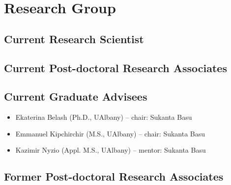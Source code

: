 \section{Research Group}

\normalsize

\subsection*{Current Research Scientist}


\subsection*{Current Post-doctoral Research Associates}


\subsection*{Current Graduate Advisees}

\begin{itemize}[leftmargin=*]
    \item Ekaterina Belash (Ph.D., UAlbany) -- chair: Sukanta Basu
    \item Emmanuel Kipchirchir (M.S., UAlbany) -- chair: Sukanta Basu
    \item Kazimir Nyzio (Appl. M.S., UAlbany) -- mentor: Sukanta Basu
\end{itemize}

\subsection*{Former Post-doctoral Research Associates}

